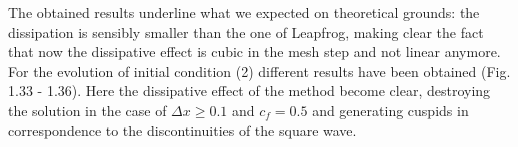 \documentclass[11pt,a4paper]{article}
\begin{document}
The obtained results underline what we expected on theoretical grounds: the dissipation is sensibly smaller than the one of Leapfrog, making clear the fact that now the dissipative effect is cubic in the mesh step and not linear anymore. For the evolution of initial condition (2) different results have been obtained (Fig. 1.33 - 1.36). Here the dissipative effect of the method become clear, destroying the solution in the case of $\Delta x \geq 0.1$ and $c_f = 0.5$ and generating cuspids in correspondence to the discontinuities of the square wave.
\begin{figure}[!h]
\begin{center}
\end{center}
\end{figure}\\
\end{document}
